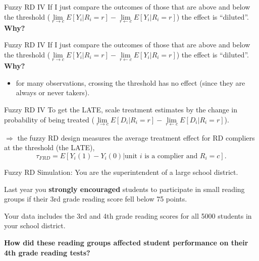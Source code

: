 \documentclass[
  ignorenonframetext,
]{beamer}
\providecommand{\tightlist}{%
  \setlength{\itemsep}{0pt}\setlength{\parskip}{0pt}}
\begin{document}
\begin{frame}{Fuzzy RD IV}
\protect\hypertarget{fuzzy-rd-iv-2}{}
If I just compare the outcomes of those that are above and below the
threshold
(\(\lim\limits_{r\rightarrow c} E[Y_i|R_i=r]-\lim\limits_{r\leftarrow c}E[Y_i|R_i=r]\))
the effect is ``diluted''. \textbf{Why?}
\end{frame}

\begin{frame}{Fuzzy RD IV}
\protect\hypertarget{fuzzy-rd-iv-3}{}
If I just compare the outcomes of those that are above and below the
threshold
(\(\lim\limits_{r\rightarrow c} E[Y_i|R_i=r]-\lim\limits_{r\leftarrow c}E[Y_i|R_i=r]\))
the effect is ``diluted''. \textbf{Why?}

\begin{itemize}
\tightlist
\item
  for many observations, crossing the threshold has no effect (since
  they are always or never takers).
\end{itemize}
\end{frame}

\begin{frame}{Fuzzy RD IV}
\protect\hypertarget{fuzzy-rd-iv-4}{}
To get the LATE, scale treatment estimates by the change in probability
of being treated
(\(\lim\limits_{r\rightarrow c} E[D_i|R_i=r]-\lim\limits_{r\leftarrow c}E[D_i|R_i=r]\)).

\(\Rightarrow\) the fuzzy RD design measures the average treatment
effect for RD compliers at the threshold (the LATE), \[
\tau_{FRD}=E[Y_i(1)-Y_i(0)|\text{unit }i\text{ is a complier and } R_i=c]. 
\]
\end{frame}

\begin{frame}{Fuzzy RD Simulation:}
\protect\hypertarget{fuzzy-rd-simulation}{}
You are the superintendent of a large school district.

Last year you \textbf{strongly encouraged} students to participate in
small reading groups if their 3rd grade reading score fell below 75
points.

Your data includes the 3rd and 4th grade reading scores for all 5000
students in your school district.

\textbf{How did these reading groups affected student performance on
their 4th grade reading tests?}
\end{frame}
\end{document}

